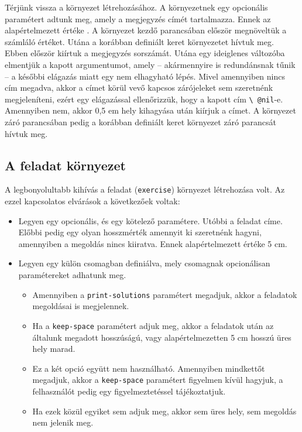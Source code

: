 Térjünk vissza a környezet létrehozásához. A környezetnek egy opcionális
paramétert adtunk meg, amely a megjegyzés címét tartalmazza. Ennek az
alapértelmezett értéke
.
A környezet kezdő parancsában először megnöveltük a számláló értéket.
Utána a korábban definiált keret környezetet hívtuk meg. Ebben először
kiírtuk a megjegyzés sorszámát. Utána egy ideiglenes változóba elmentjük
a kapott argumentumot, amely -- akármennyire is redundánsnak tűnik --  a későbbi
elágazás miatt egy nem elhagyható lépés. Mivel amennyiben nincs cím megadva,
akkor a címet körül vevő kapcsos zárójeleket sem szeretnénk megjeleníteni,
ezért egy elágazással ellenőrizzük, hogy a kapott cím \texttt{\textbackslash
	@nil}-e. Amennyiben nem, akkor 0,5 em hely kihagyása után
kiírjuk a címet. A környezet záró parancsában pedig a korábban definiált
keret környezet záró parancsát hívtuk meg.

\subsection{A feladat környezet}

A legbonyolultabb kihívás a feladat (\texttt{exercise}) környezet létrehozása
volt. Az ezzel kapcsolatos elvárások a következőek voltak:
\begin{itemize}
	\item Legyen egy opcionális, és egy kötelező paramétere. Utóbbi a feladat
	      címe. Előbbi pedig egy olyan hosszmérték amennyit ki szeretnénk hagyni,
	      amennyiben a megoldás nincs kiiratva. Ennek alapértelmezett értéke
	      5 cm.


	\item Legyen egy külön csomagban definiálva, mely csomagnak opcionálisan
	      paramétereket adhatunk meg.
	      \begin{itemize}
		      \item Amennyiben a \texttt{print-solutions} paramétert megadjuk,
		            akkor a feladatok megoldásai is megjelennek.

		      \item Ha a \texttt{keep-space} paramétert adjuk meg, akkor
		            a feladatok után az általunk megadott hosszúságú, vagy
		            alapértelmezetten 5 cm hosszú üres hely marad.

		      \item Ez a két opció együtt nem használható. Amennyiben mindkettőt
		            megadjuk, akkor a \texttt{keep-space} paramétert figyelmen kívül
		            hagyjuk, a felhasználót pedig egy figyelmeztetéssel
		            tájékoztatjuk.

		      \item Ha ezek közül egyiket sem adjuk meg, akkor sem üres hely,
		            sem megoldás nem jelenik meg.
	      \end{itemize}
\end{itemize}

